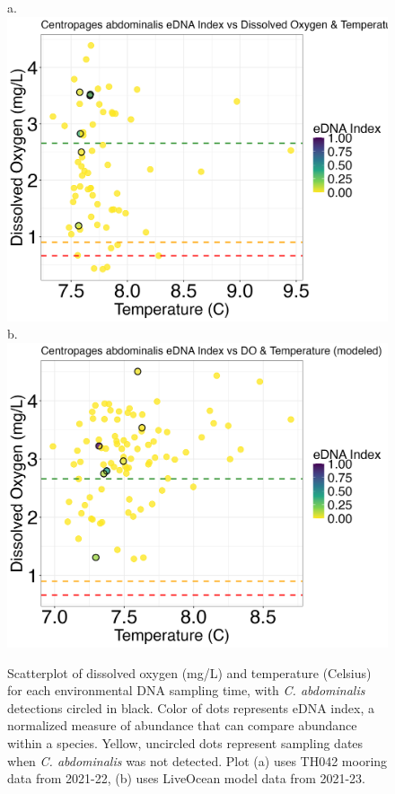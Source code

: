 \documentclass[12pt,twoside]{reedthesis}
\begin{document}
{	\begin{figure}[!h]
		\begin{center}
			a. \includegraphics[scale=0.3]{Cabdominalis_Scatter_noOut}
			b. \includegraphics[scale=0.3]{Cabdominalis_Scatter_AllYr_mod_noOut}
			\caption[\textit{C. abdominalis} scatterplot]{\footnotesize{Scatterplot of dissolved oxygen (mg/L) and temperature (Celsius) for each environmental DNA sampling time, with \textit{C. abdominalis} detections circled in black. Color of dots represents eDNA index, a normalized measure of abundance that can compare abundance within a species. Yellow, uncircled dots represent sampling dates when \textit{C. abdominalis} was not detected. Plot (a) uses TH042 mooring data from 2021-22, (b) uses LiveOcean model data from 2021-23.}} %
			\label{CabdominalisScatter}
		\end{center}
	\end{figure} 
	
}
\end{document}
